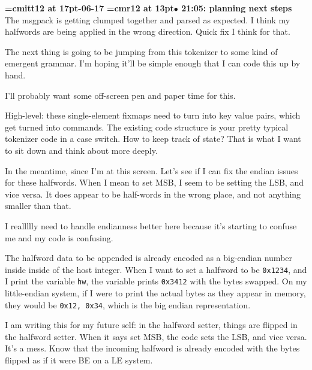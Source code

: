 {\medskip\noindent\bf\font\titlefont=cmitt12 at 17pt-06-17}\medskip
{\smallskip\noindent\bf\font\titlefont=cmr12 at 13pt\titlefont $\bullet$ 21:05: planning next steps}\smallskip
The msgpack is getting clumped together and parsed as expected. I think my halfwords are being applied in the wrong direction. Quick fix I think for that.
\par

The next thing is going to be jumping from this tokenizer to some kind of emergent grammar. I'm hoping it'll be simple enough that I can code this up by hand.
\par

I'll probably want some off-screen pen and paper time for this.
\par

High-level: these single-element fixmaps need to turn into key value pairs, which get turned into commands. The existing code structure is your pretty typical tokenizer code in a case switch. How to keep track of state? That is what I want to sit down and think about more deeply.
\par

In the meantime, since I'm at this screen. Let's see if I can fix the endian issues for these halfwords. When I mean to set MSB, I seem to be setting the LSB, and vice versa. It does appear to be half-words in the wrong place, and not anything smaller than that.
\par

I reallllly need to handle endianness better here because it's starting to confuse me and my code is confusing.
\par

The halfword data to be appended is already encoded as a big-endian number inside inside of the host integer. When I want to set a halfword to be {\tt 0x1234}, and I print the variable {\tt hw}, the variable prints {\tt 0x3412} with the bytes swapped. On my little-endian system, if I were to print the actual bytes as they appear in memory, they would be {\tt 0x12, 0x34}, which is the big endian representation.
\par

I am writing this for my future self: in the halfword setter, things are flipped in the halfword setter. When it says set MSB, the code sets the LSB, and vice versa. It's a mess. Know that the incoming halfword is already encoded with the bytes flipped as if it were BE on a LE system.
\par

